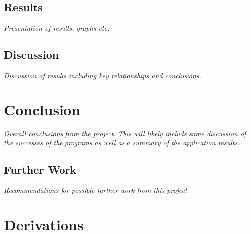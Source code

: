 \documentclass[10pt,a4paper,titlepage]{report}
\begin{document}
\section{Results}
\textit{Presentation of results, graphs etc.}
\section{Discussion}
\textit{Discussion of results including key relationships and conclusions.}
\chapter{Conclusion}
\textit{Overall conclusions from the project. This will likely include some discussion of the successes of the programs as well as a summary of the application results.}
\section{Further Work}
\textit{Recommendations for possible further work from this project.}
\appendix
\chapter{Derivations}
\label{ch:Derivations}
\end{document}
